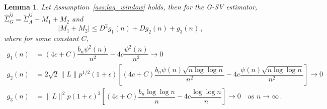 \documentclass[12pt]{article}
\newtheorem{lemma}{Lemma}
\theoremstyle{remark}
\begin{document}
\begin{lemma} \label{lemma:G-SVE_breakdown}
Let Assumption~\ref{ass:lag_window} holds, then for the G-SV estimator, $\hat{\Sigma}_{G}^{ij} = \tilde{\Sigma}_A^{ij} + M_1 + M_2$ and 
\[
|M_1 + M_2| \leq D^2 g_1(n) + D g_2(n) + g_3(n)\,,
\]
where for some constant $C$,
\begin{align*}
    g_1(n) &= (4c+C)\dfrac{b_n \psi^2(n)}{n^2} - 4c\dfrac{\psi^2(n)}{n^2} \to 0\\
    g_2(n) &= 2\sqrt{2}\|L\|p^{1/2}(1+\epsilon)\left[(4c+C)\dfrac{b_n\psi(n)\sqrt{n\log \log n}}{n^2} - 4c\dfrac{\psi(n)\sqrt{n\log \log n}}{n^2}\right] \to 0\\
    g_3(n) &= \|L\|^2 p (1+\epsilon)^2\left[(4c+C)\dfrac{b_n \log\log n}{n} - 4c \dfrac{\log \log n}{n}\right] \to 0 \quad \text{as }n \to \infty\,.
\end{align*}
\end{lemma}
\end{document}
